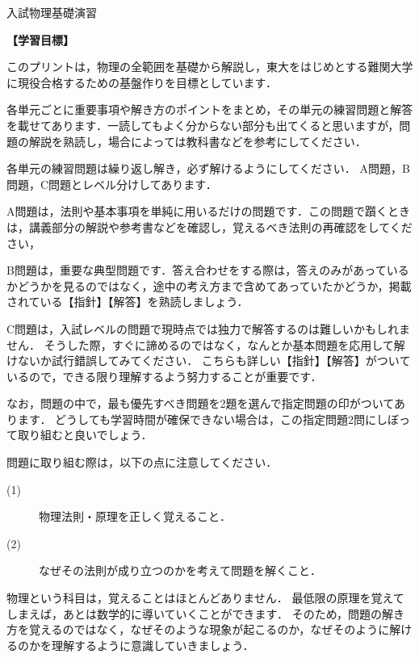 \documentclass[a4j,10pt]{jsarticle}
\begin{document}
{\huge 入試物理基礎演習}
\vspace{5mm}

{\bf【学習目標】}

このプリントは，物理の全範囲を基礎から解説し，東大をはじめとする難関大学に現役合格するための基盤作りを目標としています．

各単元ごとに重要事項や解き方のポイントをまとめ，その単元の練習問題と解答を載せてあります．一読してもよく分からない部分も出てくると思いますが，問題の解説を熟読し，場合によっては教科書などを参考にしてください．

各単元の練習問題は繰り返し解き，必ず解けるようにしてください．
A問題，B問題，C問題とレベル分けしてあります．

A問題は，法則や基本事項を単純に用いるだけの問題です．この問題で躓くときは，講義部分の解説や参考書などを確認し，覚えるべき法則の再確認をしてください，

B問題は，重要な典型問題です．答え合わせをする際は，答えのみがあっているかどうかを見るのではなく，途中の考え方まで含めてあっていたかどうか，掲載されている【指針】【解答】を熟読しましょう．

C問題は，入試レベルの問題で現時点では独力で解答するのは難しいかもしれません．
そうした際，すぐに諦めるのではなく，なんとか基本問題を応用して解けないか試行錯誤してみてください．
こちらも詳しい【指針】【解答】がついているので，できる限り理解するよう努力することが重要です．

なお，問題の中で，最も優先すべき問題を2題を選んで指定問題の印がついてあります．
どうしても学習時間が確保できない場合は，この指定問題2問にしぼって取り組むと良いでしょう．

問題に取り組む際は，以下の点に注意してください．
\begin{description}
\item[(1)] $物理法則・原理を正しく覚えること．$
\item[(2)] $なぜその法則が成り立つのかを考えて問題を解くこと．$
\end{description}

物理という科目は，覚えることはほとんどありません．
最低限の原理を覚えてしまえば，あとは数学的に導いていくことができます．
そのため，問題の解き方を覚えるのではなく，なぜそのような現象が起こるのか，なぜそのように解けるのかを理解するように意識していきましょう．




\vspace{5mm}

%
%
%
%
\end{document}
